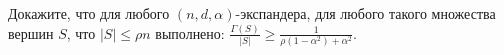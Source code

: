Докажите, что для любого $(n, d, \alpha)$-экспандера, для любого такого множества вершин $S$, что $|S| \le \rho n$ выполнено:
$\frac{\Gamma(S)}{|S|} \ge \frac{1}{\rho(1 - \alpha^2) + \alpha^2}$.